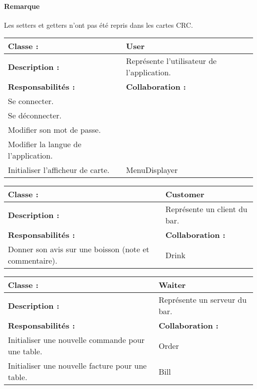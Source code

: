 

\paragraph{Remarque} Les setters et getters
n'ont pas été repris dans les cartes CRC.

\begin{center}

\begin{tabular}{|p{6cm}p{6cm}|}
	\hline
		\textbf{Classe :} & User \\
	\hline
		\textbf{Description :} & Représente l'utilisateur de l'application. \\
	\hline
		\textbf{Responsabilités :} & \textbf{Collaboration :} \\
		Se connecter. & \\
		Se déconnecter. & \\
		Modifier son mot de passe. & \\
		Modifier la langue de l'application. & \\
		Initialiser l'afficheur de carte. & MenuDisplayer \\
	\hline		
\end{tabular}

\vspace{0.5cm}

\begin{tabular}{|p{6cm}p{6cm}|}
	\hline
		\textbf{Classe :} & Customer \\
	\hline
		\textbf{Description :} & Représente un client du bar. \\
	\hline
		\textbf{Responsabilités :} & \textbf{Collaboration :} \\

		Donner son avis sur une boisson (note et commentaire). & Drink \\

	\hline		
\end{tabular}

\vspace{0.5cm}

\begin{tabular}{|p{6cm}p{6cm}|}
	\hline
		\textbf{Classe :} & Waiter \\
	\hline
		\textbf{Description :} & Représente un serveur du bar. \\
	\hline
		\textbf{Responsabilités :} & \textbf{Collaboration :} \\
		Initialiser une nouvelle commande pour une table. & Order \\
		Initialiser une nouvelle facture pour une table. & Bill \\
	\hline		
\end{tabular}


\end{center}
